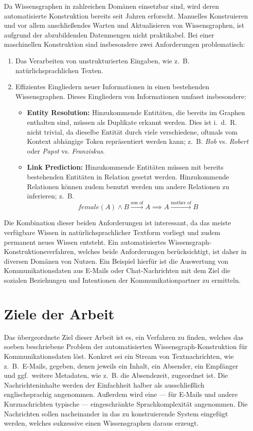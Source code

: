 Da Wissensgraphen in zahlreichen Domänen einsetzbar sind, wird deren automatisierte Konstruktion bereits seit Jahren erforscht.
Manuelles Konstruieren und vor allem anschließendes Warten und Aktualisieren von Wissensgraphen, ist aufgrund der abzubildenden Datenmengen nicht praktikabel.
Bei einer maschinellen Konstruktion sind insbesondere zwei Anforderungen problematisch:
\begin{enumerate}
	\item Das Verarbeiten von unstrukturierten Eingaben, wie z.~B. natürlichsprachlichen Texten.
	\item Effizientes Eingliedern neuer Informationen in einen bestehenden Wissensgraphen.
		Dieses Eingliedern von Informationen umfasst insbesondere:
		\begin{itemize}
			\item \textbf{Entity Resolution:}
				Hinzukommende Entitäten, die bereits im Graphen enthalten sind, müssen als Duplikate erkannt werden.
				Dies ist i.~d.~R. nicht trivial, da dieselbe Entität durch viele verschiedene, oftmals vom Kontext abhängige Token repräsentiert werden kann;
				z.~B. \textit{Bob} vs. \textit{Robert} oder \textit{Papst} vs. \textit{Franziskus}.
			\item \textbf{Link Prediction:}
				Hinzukommende Entitäten müssen mit bereits bestehenden Entitäten in Relation gesetzt werden.
				Hinzukommende Relationen können zudem benutzt werden um andere Relationen zu inferieren;
				z.~B. \[female(A) \land B \xrightarrow{\text{son~of}} A \implies A \xrightarrow{\text{mother~of}} B\]
		\end{itemize}
\end{enumerate}

Die Kombination dieser beiden Anforderungen ist interessant, da das meiste verfügbare Wissen in natürlichsprachlicher Textform vorliegt und zudem permanent neues Wissen entsteht.
Ein automatisiertes Wissensgraph-Konstruktionsverfahren, welches beide Anforderungen berücksichtigt, ist daher in diversen Domänen von Nutzen.
Ein Beispiel hierfür ist die Auswertung von Kommunikationsdaten aus E-Mails oder Chat-Nachrichten mit dem Ziel die sozialen Beziehungen und Intentionen der Kommunikationpartner zu ermitteln.

\section{Ziele der Arbeit}%
\label{sec:intro:goals}

Das übergeordnete Ziel dieser Arbeit ist es, ein Verfahren zu finden, welches das soeben beschriebene Problem der automatisierten Wissensgraph-Konstruktion für Kommunikationsdaten löst.
Konkret sei ein Stream von Textnachrichten, wie z.~B.\ E-Mails, gegeben, denen jeweils ein Inhalt, ein Absender, ein Empfänger und ggf.\ weitere Metadaten, wie z.~B. die Absendezeit, zugeordnet ist.
Die Nachrichteninhalte werden der Einfachheit halber als ausschließlich englischsprachig angenommen.
Außerdem wird eine --- für E-Mails und andere Kurznachrichten typische --- eingeschränkte Sprachkomplexität angenommen.
Die Nachrichten sollen nacheinander in das zu konstruierende System eingefügt werden, welches sukzessive einen Wissensgraphen daraus erzeugt.

